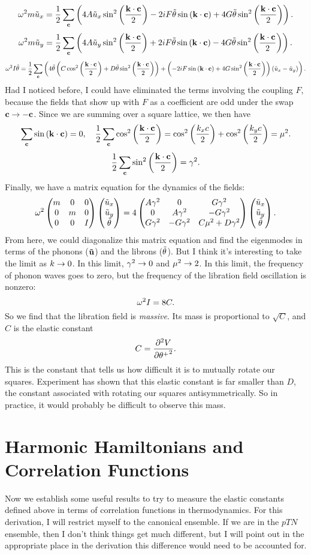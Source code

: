 \documentclass[12pt]{article}
\begin{document}
\[ \omega^2 m \tilde u_x = \frac{1}{2}\sum_{\mathbf{c}} \left( 4A\tilde u_x \sin^2\left(\frac{\mathbf{k}\cdot\mathbf{c}}{2}\right) - 2iF\tilde {\theta} \sin{\left(\ensuremath{\mathbf{k}\cdot\mathbf{c}}\right)} + 4G\tilde {\theta} \sin^2\left(\frac{\mathbf{k}\cdot\mathbf{c}}{2}\right)\right).\]
\[ \omega^2 m \tilde u_y = \frac{1}{2}\sum_{\mathbf{c}} \left( 4A\tilde u_y \sin^2\left(\frac{\mathbf{k}\cdot\mathbf{c}}{2}\right) + 2iF\tilde {\theta} \sin{\left(\ensuremath{\mathbf{k}\cdot\mathbf{c}}\right)} - 4G\tilde {\theta} \sin^2\left(\frac{\mathbf{k}\cdot\mathbf{c}}{2}\right)\right).\]
\[ \omega^2 I \tilde {\theta} = \frac{1}{2}\sum_{\mathbf{c}} \left( 4 \tilde {\theta}\left(C \cos^2\left(\frac{\mathbf{k}\cdot\mathbf{c}}{2}\right) + D \tilde {\theta} \sin^2\left(\frac{\mathbf{k}\cdot\mathbf{c}}{2}\right)\right) + \left(-2i F\sin{\left(\ensuremath{\mathbf{k}\cdot\mathbf{c}}\right)} + 4G \sin^2\left(\frac{\mathbf{k}\cdot\mathbf{c}}{2}\right)\right)\left(\tilde u_x - \tilde u_y\right) \right).\]
Had I noticed before, I could have eliminated the terms involving the coupling $F$, because the fields that show up with $F$ as a coefficient are odd under the swap $\mathbf{c}\rightarrow- \mathbf{c}$. Since we are summing over a square lattice, we then have
\[ \sum_{\mathbf{c}} \sin{\left(\ensuremath{\mathbf{k}\cdot\mathbf{c}}\right)} = 0,\quad \frac{1}{2}\sum_{\mathbf{c}} \cos^2\left(\frac{\mathbf{k}\cdot\mathbf{c}}{2}\right) = \cos^2\left(\frac{k_x c}{2}\right) + \cos^2\left(\frac{k_y c}{2}\right) = \mu^2.\]
\[ \frac{1}{2}\sum_{\mathbf{c}} \sin^2\left(\frac{\mathbf{k}\cdot\mathbf{c}}{2}\right) = \gamma^2.\]
Finally, we have a matrix equation for the dynamics of the fields:
\[ \omega^2\left(\begin{matrix}m & 0 & 0 \\ 0 & m & 0 \\ 0 & 0 & I\end{matrix}\right)\left(\begin{matrix}\tilde u_x \\\tilde  u_y \\\tilde {\theta}\end{matrix}\right) = 4\left(\begin{matrix}A\gamma^2 & 0 & G\gamma^2 \\ 0 & A\gamma^2 & -G\gamma^2 \\ G \gamma^2 & - G\gamma^2 & C\mu^2 + D\gamma^2\end{matrix}\right)\left(\begin{matrix}\tilde u_x \\ \tilde u_y \\ \tilde {\theta}\end{matrix}\right).\]
From here, we could diagonalize this matrix equation and find the eigenmodes in terms of the phonons ($\mathbf{\tilde u}$) and the librons ($\tilde {\theta}$). But I think it's interesting to take the limit as $k\rightarrow 0$. In this limit, $\gamma^2\rightarrow 0$ and $\mu^2 \rightarrow 2$. In this limit, the frequency of phonon waves goes to zero, but the frequency of the libration field oscillation is nonzero:
\[ \omega^2 I = 8C.\]
So we find that the libration field is \emph{massive}. Its mass is proportional to $\sqrt{C}$, and $C$ is the elastic constant
\[ C = \frac{\partial^2 {V}}{\partial {\theta^+}^2}.\]
This is the constant that tells us how difficult it is to mutually rotate our squares. Experiment has shown that this elastic constant is far smaller than $D$, the constant associated with rotating our squares antisymmetrically. So in practice, it would probably be difficult to observe this mass. 


\section{Harmonic Hamiltonians and Correlation Functions}
Now we establish some useful results to try to measure the elastic constants defined above in terms of correlation functions in thermodynamics. For this derivation, I will restrict myself to the canonical ensemble. If we are in the $pTN$ ensemble, then I don't think things get much different, but I will point out in the appropriate place in the derivation this difference would need to be accounted for.
\end{document}
